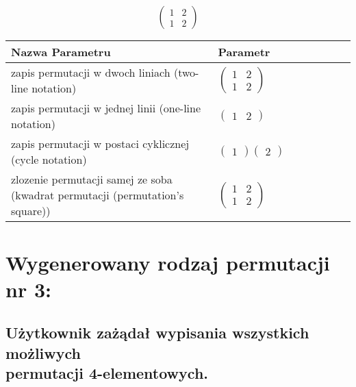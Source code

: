 \documentclass[12pt]{article}
\begin{document}
\subsection{}
\begin{center}
\[
\begin{pmatrix}
	1 & 2 \\ 
	1 & 2 
\end{pmatrix}
\]

\begin{tabular}{|m{0.6\linewidth}|m{0.4\linewidth}|}
	\hline
	Nazwa Parametru & Parametr \\
	\hline
	zapis permutacji w dwoch liniach (two-line notation) & $\begin{pmatrix} 1 & 2 \\ 
1 & 2 \end{pmatrix}$ \\ 
	\hline
	zapis permutacji w jednej linii (one-line notation) & $\begin{pmatrix} 1 & 2 \end{pmatrix}$ \\ 
	\hline
	zapis permutacji w postaci cyklicznej (cycle notation) & $\begin{pmatrix} 1 \end{pmatrix} \begin{pmatrix} 2 \end{pmatrix} $ \\ 
	\hline
	zlozenie permutacji samej ze soba (kwadrat permutacji (permutation's square)) & $\begin{pmatrix} 1 & 2 \\ 
1 & 2 \end{pmatrix}$ \\ 
	\hline
\end{tabular}
\end{center}


\section{Wygenerowany rodzaj permutacji nr 3:}
\subsection*{Użytkownik zażądał wypisania wszystkich możliwych\\ permutacji 4-elementowych.}
\end{document}
